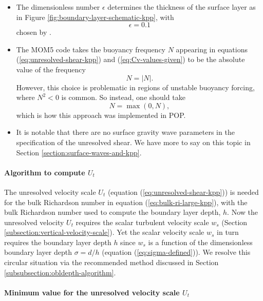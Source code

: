 \begin{itemize}
\item The dimensionless number $\epsilon$ determines the thickness of
  the surface layer as in Figure
  \ref{fig:boundary-layer-schematic-kpp}, with
\begin{equation}
 \epsilon = 0.1 
\end{equation}
chosen by \cite{LargeKPP}.  

\item The MOM5 code takes the buoyancy frequency $N$ appearing in
  equations (\ref{eq:unresolved-shear-kpp}) and
  (\ref{eq:Cv-values-given}) to be the absolute value of the frequency
\begin{equation}
 N  = |N|.  
\end{equation}
However, this choice is problematic in regions of unstable buoyancy
forcing, where $N^{2} < 0$ is common.  So instead, one should take 
\begin{equation}
 N = \max(0,N),
\end{equation}
 which is how this approach was implemented in POP.  
 
\item It is notable that there are no surface gravity wave parameters in the
specification of the unresolved shear.  We have more to say on this
topic in Section \ref{section:surface-waves-and-kpp}. 

\end{itemize}


\paragraph{Algorithm to compute $U_{t}$} 

\mbox{}
\newline 

The unresolved velocity scale $U_{t}$ (equation
(\ref{eq:unresolved-shear-kpp})) is needed for the bulk Richardson
number in equation (\ref{eq:bulk-ri-large-kpp}), with the bulk
Richardson number used to compute the boundary layer depth, $h$.  Now
the unresolved velocity $U_{t}$ requires the scalar turbulent velocity
scale $w_{s}$ (Section \ref{subsection:vertical-velocity-scale}).  Yet
the scalar velocity scale $w_{s}$ in turn requires the boundary layer
depth $h$ since $w_{s}$ is a function of the dimensionless boundary
layer depth $\sigma = d/h$ (equation (\ref{eq:sigma-defined})).  We
resolve this circular situation via the recommended method discussed
in Section \ref{subsubsection:obldepth-algorithm}.


\paragraph{Minimum value for the unresolved velocity scale $U_{t}$}

